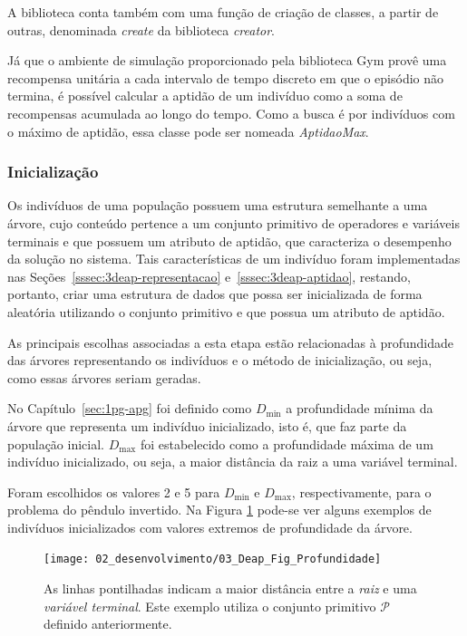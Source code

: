 A biblioteca conta também com uma função de criação de classes, a partir de outras, denominada \textit{create} da biblioteca \textit{creator}.


Já que o ambiente de simulação proporcionado pela biblioteca Gym provê uma recompensa unitária a cada intervalo de tempo discreto em que o episódio não termina, é possível calcular a aptidão de um indivíduo como a soma de recompensas acumulada ao longo do tempo. Como a busca é por indivíduos com o máximo de aptidão, essa classe pode ser nomeada \textit{AptidaoMax}.

\subsubsection{Inicialização}\label{sssec:3deap-inicializacao}

Os indivíduos de uma população possuem uma estrutura semelhante a uma árvore, cujo conteúdo pertence a um conjunto primitivo de operadores e variáveis terminais e que possuem um atributo de aptidão, que caracteriza o desempenho da solução no sistema. Tais características de um indivíduo foram implementadas nas Seções~\ref{sssec:3deap-representacao} e~\ref{sssec:3deap-aptidao}, restando, portanto, criar uma estrutura de dados que possa ser inicializada de forma aleatória utilizando o conjunto primitivo e que possua um atributo de aptidão.

As principais escolhas associadas a esta etapa estão relacionadas à profundidade das árvores representando os indivíduos e o método de inicialização, ou seja, como essas árvores seriam geradas.

No Capítulo~\ref{sec:1pg-apg} foi definido como $D_{\min}$ a profundidade mínima da árvore que representa um indivíduo inicializado, isto é, que faz parte da população inicial. $D_{\max}$ foi estabelecido como a profundidade máxima de um indivíduo inicializado, ou seja, a maior distância da raiz a uma variável terminal.

Foram escolhidos os valores 2 e 5 para $D_{\min}$ e $D_{\max}$, respectivamente, para o problema do pêndulo invertido. Na Figura \ref{fig:3deap-profundidade} pode-se ver alguns exemplos de indivíduos inicializados com valores extremos de profundidade da árvore.

\begin{figure}[H]
	\centering
	\texttt{[image: 02\_desenvolvimento/03\_Deap\_Fig\_Profundidade]}
	\caption{As linhas pontilhadas indicam a maior distância entre a \textit{raiz} e uma \textit{variável terminal}. Este exemplo utiliza o conjunto primitivo $\mathcal{P}$ definido anteriormente.}\label{fig:3deap-profundidade}
\end{figure}

